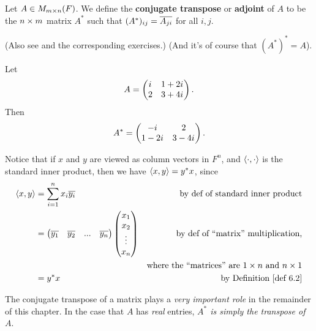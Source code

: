 \begin{definition} \label{def 6.2}
Let \(A \in M_{m \times n}(F)\).
We define the \textbf{conjugate transpose} or \textbf{adjoint} of \(A\) to be the \(n \times m\) matrix \(A^*\) such that \((A^*)_{ij} = \overline{A_{ji}}\) for all \(i, j\).

(Also see  and the corresponding exercises.)
(And it's of course that \((A^*)^* = A\)).
\end{definition}

\begin{example} \label{example 6.1.4}
Let
\[
    A = \begin{pmatrix} {i\mkern1mu} & 1 + 2{i\mkern1mu} \\ 2 & 3 + 4{i\mkern1mu} \end{pmatrix}.
\]
Then
\[
    A^* = \begin{pmatrix} -{i\mkern1mu} & 2 \\ 1 - 2{i\mkern1mu} & 3 - 4{i\mkern1mu} \end{pmatrix}.
\]
\end{example}

\begin{remark} \label{remark 6.1.3}
Notice that if \(x\) and \(y\) are viewed as column vectors in \(F^n\), and \(\left< \cdot, \cdot \right>\) is the standard inner product, then we have \(\left< x, y \right> = y^* x\), since
\begin{align*}
    \LG x, y \RG & = \sum_{i = 1}^n x_i \conjugatet{y_i} & \text{by def of standard inner product} \\
    & = \begin{pmatrix} \conjugatet{y_1} & \conjugatet{y_2} & ... & \conjugatet{y_n} \end{pmatrix} \begin{pmatrix} x_1 \\ x_2 \\ \vdots \\ x_n \end{pmatrix} & \text{by def of ``matrix'' multiplication,} \\
    & & \text{where the ``matrices'' are \(1 \X n\) and \(n \X 1\)} \\
    & = y^* x & \text{by \DEF{6.2}}
\end{align*}
\end{remark}

\begin{remark} \label{remark 6.1.4}
The conjugate transpose of a matrix plays a \emph{very important role} in the remainder of this chapter. In the case that \(A\) has \emph{real} entries, \emph{\(A^*\) is simply the transpose of \(A\)}.
\end{remark}

